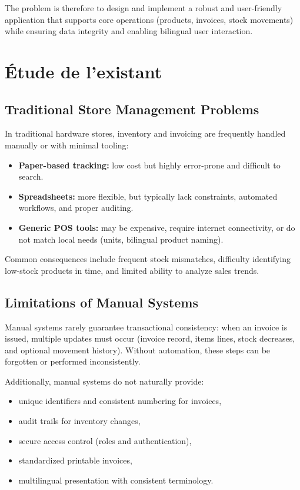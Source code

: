 \documentclass[12pt,a4paper]{report}
\begin{document}
The problem is therefore to design and implement a robust and user-friendly application that supports core operations (products, invoices, stock movements) while ensuring data integrity and enabling bilingual user interaction.

\chapter{Étude de l’existant}

\section{Traditional Store Management Problems}
In traditional hardware stores, inventory and invoicing are frequently handled manually or with minimal tooling:
\begin{itemize}
  \item \textbf{Paper-based tracking:} low cost but highly error-prone and difficult to search.
  \item \textbf{Spreadsheets:} more flexible, but typically lack constraints, automated workflows, and proper auditing.
  \item \textbf{Generic POS tools:} may be expensive, require internet connectivity, or do not match local needs (units, bilingual product naming).
\end{itemize}

Common consequences include frequent stock mismatches, difficulty identifying low-stock products in time, and limited ability to analyze sales trends.

\section{Limitations of Manual Systems}
Manual systems rarely guarantee transactional consistency: when an invoice is issued, multiple updates must occur (invoice record, items lines, stock decreases, and optional movement history). Without automation, these steps can be forgotten or performed inconsistently.

Additionally, manual systems do not naturally provide:
\begin{itemize}
  \item unique identifiers and consistent numbering for invoices,
  \item audit trails for inventory changes,
  \item secure access control (roles and authentication),
  \item standardized printable invoices,
  \item multilingual presentation with consistent terminology.
\end{itemize}
\end{document}
